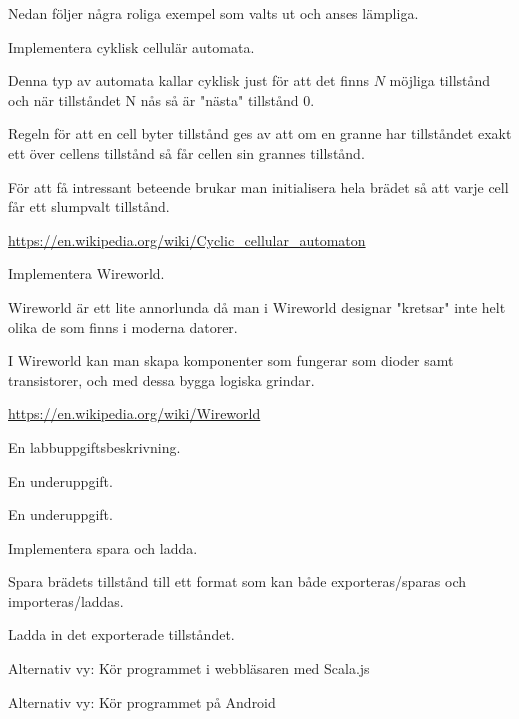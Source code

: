     Nedan följer några roliga exempel som valts ut och anses lämpliga.

    \Subtask Implementera cyklisk cellulär automata.

        Denna typ av automata kallar cyklisk just för att det finns $N$ möjliga tillstånd och när tillståndet N nås så är "nästa" tillstånd $0$.

        Regeln för att en cell byter tillstånd ges av att om en granne har tillståndet exakt ett över cellens tillstånd så får cellen sin grannes tillstånd.

        För att få intressant beteende brukar man initialisera hela brädet så att varje cell får ett slumpvalt tillstånd.

        \url{https://en.wikipedia.org/wiki/Cyclic_cellular_automaton}

    \Subtask Implementera Wireworld.

        Wireworld är ett lite annorlunda då man i Wireworld designar "kretsar" inte helt olika de som finns i moderna datorer.

        I Wireworld kan man skapa komponenter som fungerar som dioder samt transistorer, och med dessa bygga logiska grindar.

        \url{https://en.wikipedia.org/wiki/Wireworld}


\Task En labbuppgiftsbeskrivning.

    \Subtask En underuppgift.

    \Subtask En underuppgift.


\Task Implementera spara och ladda.

    \Subtask Spara brädets tillstånd till ett format som kan både exporteras/sparas och importeras/laddas.

    \Subtask Ladda in det exporterade tillståndet.



\Task Alternativ vy: Kör programmet i webbläsaren med Scala.js


\Task Alternativ vy: Kör programmet på Android


